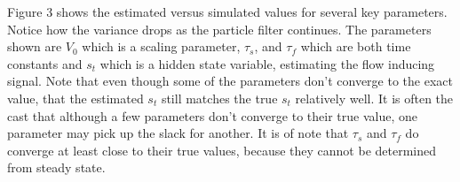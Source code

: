 \documentclass{article}
\begin{document}
Figure 3 shows the estimated versus simulated values for
several key parameters. Notice how the variance drops as
the particle filter continues. The parameters shown are
$V_0$ which is a scaling parameter, $\tau_s$, and $\tau_f$
which are both time constants and $s_t$ which is a hidden
state variable, estimating the flow inducing signal. Note that
even though some of the parameters don't converge to the exact
value, that the estimated $s_t$ still matches the true
$s_t$ relatively well. It is often the cast that although a
few parameters don't converge to their true value, one 
parameter may pick up the slack for another. It is of
note that $\tau_s$ and $\tau_f$ do converge at least close
to their true values, because they cannot be determined
from steady state. 



\end{document}
